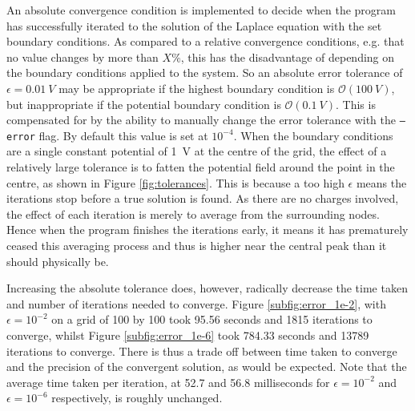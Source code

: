 An absolute convergence condition is implemented to decide when the program has successfully iterated to the solution of the Laplace equation with the set boundary conditions. As compared to a relative convergence conditions, e.g. that no value changes by more than $X\%$, this has the disadvantage of depending on the boundary conditions applied to the system. So an absolute error tolerance of $\epsilon = \SI{0.01}{V}$ may be appropriate if the highest boundary condition is $\mathcal{O}(\SI{100}{V})$, but inappropriate if the potential boundary condition is $\mathcal{O}(\SI{0.1}{V})$. This is compensated for by the ability to manually change the error tolerance with the \texttt{--error} flag. By default this value is set at $10^{-4}$. When the boundary conditions are a single constant potential of \SI{1}{V} at the centre of the grid, the effect of a relatively large tolerance is to fatten the potential field around the point in the centre, as shown in Figure \ref{fig:tolerances}. This is because a too high $\epsilon$ means the iterations stop before a true solution is found. As there are no charges involved, the effect of each iteration is merely to average from the surrounding nodes. Hence when the program finishes the iterations early, it means it has prematurely ceased this averaging process and thus is higher near the central peak than it should physically be.

Increasing the absolute tolerance does, however, radically decrease the time taken and number of iterations needed to converge. Figure \ref{subfig:error_1e-2}, with $\epsilon = 10^{-2}$ on a grid of 100 by 100 took 95.56 seconds and 1815 iterations to converge, whilst Figure \ref{subfig:error_1e-6} took 784.33 seconds and 13789 iterations to converge. There is thus a trade off between time taken to converge and the precision of the convergent solution, as would be expected. Note that the average time taken per iteration, at 52.7 and 56.8 milliseconds for $\epsilon = 10^{-2}$ and $\epsilon = 10^{-6}$ respectively, is roughly unchanged.

